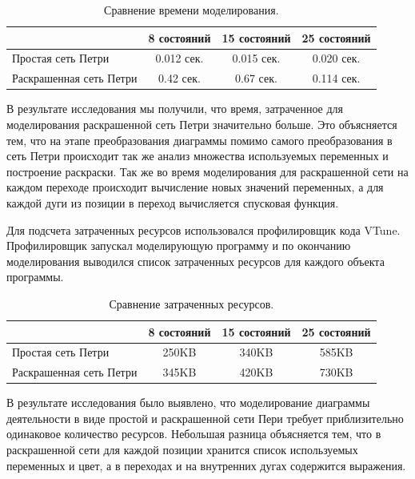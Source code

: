 \begin{table}
	\caption{Сравнение времени моделирования.}
	\begin{tabular}{|l|c|c|c|}
	\hline
	& 8 состояний & 15 состояний & 25 состояний \\
	\hline
	Простая сеть Петри & 0.012 сек. & 0.015 сек. &  0.020 сек. \\
	\hline
	Раскрашенная сеть Петри & 0.42 сек. & 0.67 сек. &  0.114 сек. \\
	\hline
	\end{tabular}
	\label{tab:table1}
\end{table}

В результате исследования мы получили, что время, затраченное для моделирования раскрашенной сеть Петри значительно больше. Это объясняется тем, что на этапе преобразования диаграммы помимо самого преобразования в сеть Петри происходит так же анализ множества используемых переменных и построение раскраски. Так же во время моделирования для раскрашенной сети на каждом переходе происходит вычисление новых значений переменных, а для каждой дуги из позиции в переход вычисляется спусковая функция.

Для подсчета затраченных ресурсов использовался профилировщик кода VTune. Профилировщик запускал моделирующую программу и по окончанию моделирования выводился список затраченных ресурсов для каждого объекта программы.

\begin{table}
	\caption{Сравнение затраченных ресурсов.}
	\begin{tabular}{|l|c|c|c|}
	\hline
	& 8 состояний & 15 состояний & 25 состояний \\
	\hline
	Простая сеть Петри & 250KB & 340KB & 585KB \\
	\hline
	Раскрашенная сеть Петри & 345KB & 420KB & 730KB \\
	\hline
	\end{tabular}
	\label{tab:table2}
\end{table}

В результате исследования было выявлено, что моделирование диаграммы деятельности в виде простой и раскрашенной сети Пери требует приблизительно одинаковое количество ресурсов. Небольшая разница объясняется тем, что в раскрашенной сети для каждой позиции хранится список используемых переменных и цвет, а в переходах и на внутренних дугах содержится выражения.

\label{cha:research}

